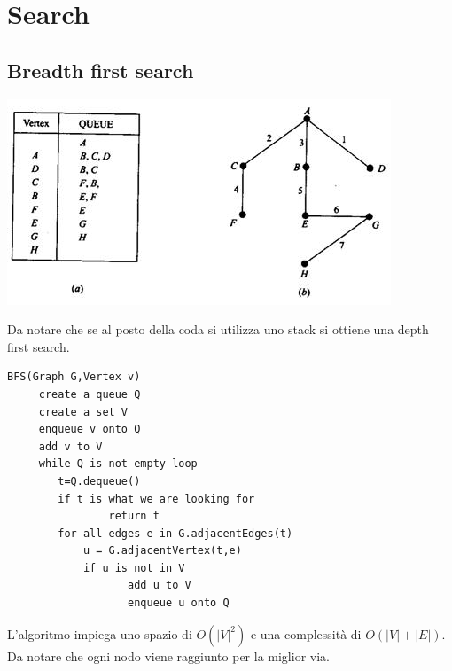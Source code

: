 \documentclass[a4paper]{book}
\newcommand{\lstIndent}{4}
\begin{document}
\section{Search}
\subsection{Breadth first search}
\begin{center}
\includegraphics[scale=1]{Figures/bfs.JPG}
\end{center}
Da notare che se al posto della coda si utilizza uno stack si ottiene una depth first search.
\begin{lstlisting}[tabsize=\lstIndent]
BFS(Graph G,Vertex v)
     create a queue Q
     create a set V
     enqueue v onto Q
     add v to V
     while Q is not empty loop
     	t=Q.dequeue()
       	if t is what we are looking for 
            	return t
     	for all edges e in G.adjacentEdges(t)
			u = G.adjacentVertex(t,e)
           	if u is not in V
            	   add u to V
            	   enqueue u onto Q           
\end{lstlisting}
L'algoritmo impiega uno spazio di $O(|V|^2)$ e una complessità di $O(|V|+|E|)$. Da notare che ogni nodo viene raggiunto per la miglior via.
\end{document}
